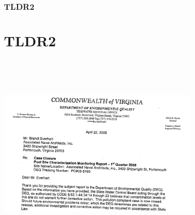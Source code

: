 \documentclass{beamer}
\begin{document}
\begin{frame}
\frametitle{TLDR2}
\section {TLDR2}
  \includegraphics[width = 4in, height = 4in]{vadeqnfa}
\end{frame}
\end{document}
